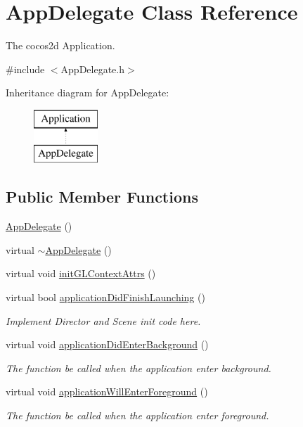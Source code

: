 \hypertarget{classAppDelegate}{\section{App\-Delegate Class Reference}
\label{classAppDelegate}
}


The cocos2d Application.  




{\ttfamily \#include $<$App\-Delegate.\-h$>$}

Inheritance diagram for App\-Delegate\-:\begin{figure}[H]
\begin{center}
\leavevmode
\includegraphics[height=2.000000cm]{classAppDelegate}
\end{center}
\end{figure}
\subsection*{Public Member Functions}
\begin{DoxyCompactItemize}
\item 
\hyperlink{classAppDelegate_a7d26ade6fbc9d35ecc9185792303f82d}{App\-Delegate} ()
\item 
virtual \hyperlink{classAppDelegate_a9f89424b5e296e3668deaa0265fc5ac1}{$\sim$\-App\-Delegate} ()
\item 
virtual void \hyperlink{classAppDelegate_a2de4e8ab7d04bde311684e1d4ceb2c0f}{init\-G\-L\-Context\-Attrs} ()
\item 
virtual bool \hyperlink{classAppDelegate_a68cbaed49edf7581dc59a09d5062fff3}{application\-Did\-Finish\-Launching} ()
\begin{DoxyCompactList}\small\item\em Implement Director and Scene init code here. \end{DoxyCompactList}\item 
virtual void \hyperlink{classAppDelegate_a17cb09777419781698324e0415bffd3a}{application\-Did\-Enter\-Background} ()
\begin{DoxyCompactList}\small\item\em The function be called when the application enter background. \end{DoxyCompactList}\item 
virtual void \hyperlink{classAppDelegate_ac4d653e3f74a91efef5f2def58fe3108}{application\-Will\-Enter\-Foreground} ()
\begin{DoxyCompactList}\small\item\em The function be called when the application enter foreground. \end{DoxyCompactList}\end{DoxyCompactItemize}


